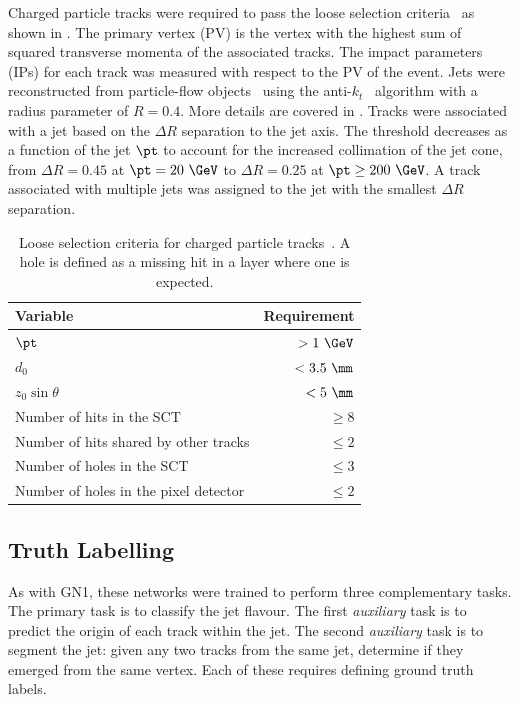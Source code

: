 Charged particle tracks were required to pass the loose selection criteria~\cite{DL1D} as shown in .
The primary vertex (PV) is the vertex with the highest sum of squared transverse momenta of the associated tracks.
The impact parameters (IPs) for each track was measured with respect to the PV of the event.
Jets were reconstructed from particle-flow objects~\cite{PFlow} using the anti-$k_t$~\cite{AntiKt} algorithm with a radius parameter of $R = 0.4$.
More details are covered in .
Tracks were associated with a jet based on the $\Delta R$ separation to the jet axis.
The threshold decreases as a function of the jet $\pt$ to account for the increased collimation of the jet cone, from $\Delta R = 0.45$ at $\pt = 20~\GeV$ to $\Delta R = 0.25$ at $\pt \geq 200~\GeV$.
A track associated with multiple jets was assigned to the jet with the smallest $\Delta R$ separation.

\begin{table}
    \centering
    \begin{tabular}{lr}
        \toprule
        Variable & Requirement \\
        \midrule
        $\pt$ & $> 1~\GeV$ \\
        $d_0$ & $< 3.5~\mm$ \\
        $z_0 \sin \theta$ & $< 5~\mm$ \\
        Number of hits in the SCT & $\geq 8$ \\
        Number of hits shared by other tracks & $\leq 2$ \\
        Number of holes in the SCT & $\leq 3$ \\
        Number of holes in the pixel detector & $\leq 2$ \\
        \bottomrule
    \end{tabular}
    \caption{Loose selection criteria for charged particle tracks~\cite{DL1D}. A hole is defined as a missing hit in a layer where one is expected.}
    \label{tab:track_loose}
\end{table}

\subsection{Truth Labelling}

As with GN1, these networks were trained to perform three complementary tasks.
The primary task is to classify the jet flavour.
The first \textit{auxiliary} task is to predict the origin of each track within the jet. The second \textit{auxiliary} task is to segment the jet: given any two tracks from the same jet, determine if they emerged from the same vertex. Each of these requires defining ground truth labels.

